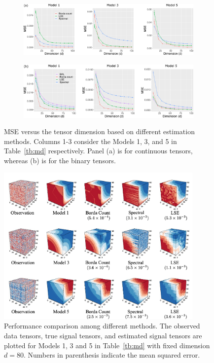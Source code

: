 \documentclass[12pt]{article}
\theoremstyle{definition}
\begin{document}
\begin{figure}[t!]
    \centering
    \begin{subfigure}[b]{.9\textwidth}
    \includegraphics[width = \textwidth]{figure/altdim_conti.pdf}
    \vspace{-.6cm}
    \end{subfigure}
    \begin{subfigure}[b]{.9\textwidth}
    \includegraphics[width = \textwidth]{figure/altdim_binary.pdf}   
    \end{subfigure}
    \caption{MSE versus the tensor dimension based on different estimation methods. Columns 1-3 consider the Models 1, 3, and 5 in Table~\ref{tb:md} respectively. Panel (a) is for continuous tensors, whereas (b) is for the binary tensors.}
    \label{fig:method}
\end{figure}


\begin{figure}[t!]
    \centering
    \includegraphics[width =0.9\textwidth]{figure/vfinal.pdf}
    \caption{Performance comparison among different methods. The observed data tensors, true signal tensors, and estimated signal tensors are plotted for Models 1, 3 and 5 in Table~\ref{tb:md} with fixed dimension $d = 80$. Numbers in parenthesis indicate the mean squared error.}
    \label{fig:contim}
\end{figure}
\end{document}
